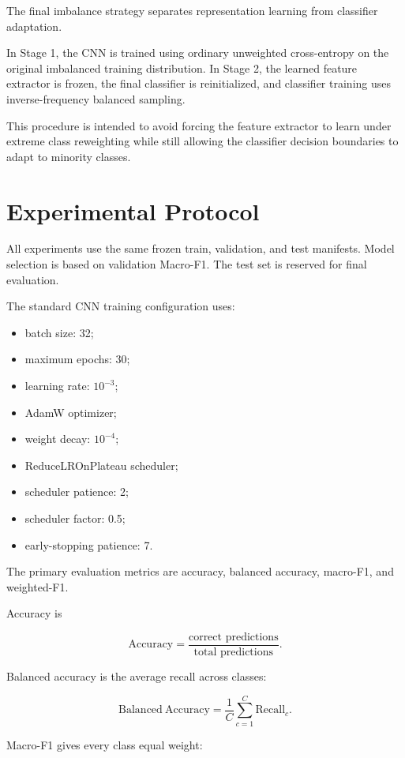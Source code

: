 \documentclass[11pt,a4paper]{article}
\begin{document}
The final imbalance strategy separates representation learning from classifier adaptation.

In Stage 1, the CNN is trained using ordinary unweighted cross-entropy on the original imbalanced training distribution. In Stage 2, the learned feature extractor is frozen, the final classifier is reinitialized, and classifier training uses inverse-frequency balanced sampling.

This procedure is intended to avoid forcing the feature extractor to learn under extreme class reweighting while still allowing the classifier decision boundaries to adapt to minority classes.

\section{Experimental Protocol}

All experiments use the same frozen train, validation, and test manifests. Model selection is based on validation Macro-F1. The test set is reserved for final evaluation.

The standard CNN training configuration uses:

\begin{itemize}
    \item batch size: 32;
    \item maximum epochs: 30;
    \item learning rate: \(10^{-3}\);
    \item AdamW optimizer;
    \item weight decay: \(10^{-4}\);
    \item ReduceLROnPlateau scheduler;
    \item scheduler patience: 2;
    \item scheduler factor: 0.5;
    \item early-stopping patience: 7.
\end{itemize}

The primary evaluation metrics are accuracy, balanced accuracy, macro-F1, and weighted-F1.

Accuracy is

\[
\mathrm{Accuracy}=\frac{\text{correct predictions}}{\text{total predictions}}.
\]

Balanced accuracy is the average recall across classes:

\[
\mathrm{Balanced\ Accuracy}
=
\frac{1}{C}
\sum_{c=1}^{C}
\mathrm{Recall}_c.
\]

Macro-F1 gives every class equal weight:
\end{document}
